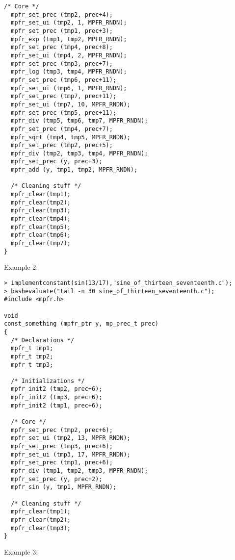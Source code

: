 \begin{center}
\begin{minipage}{15cm}
\begin{Verbatim}[frame=single]
  /* Core */
  mpfr_set_prec (tmp2, prec+4);
  mpfr_set_ui (tmp2, 1, MPFR_RNDN);
  mpfr_set_prec (tmp1, prec+3);
  mpfr_exp (tmp1, tmp2, MPFR_RNDN);
  mpfr_set_prec (tmp4, prec+8);
  mpfr_set_ui (tmp4, 2, MPFR_RNDN);
  mpfr_set_prec (tmp3, prec+7);
  mpfr_log (tmp3, tmp4, MPFR_RNDN);
  mpfr_set_prec (tmp6, prec+11);
  mpfr_set_ui (tmp6, 1, MPFR_RNDN);
  mpfr_set_prec (tmp7, prec+11);
  mpfr_set_ui (tmp7, 10, MPFR_RNDN);
  mpfr_set_prec (tmp5, prec+11);
  mpfr_div (tmp5, tmp6, tmp7, MPFR_RNDN);
  mpfr_set_prec (tmp4, prec+7);
  mpfr_sqrt (tmp4, tmp5, MPFR_RNDN);
  mpfr_set_prec (tmp2, prec+5);
  mpfr_div (tmp2, tmp3, tmp4, MPFR_RNDN);
  mpfr_set_prec (y, prec+3);
  mpfr_add (y, tmp1, tmp2, MPFR_RNDN);

  /* Cleaning stuff */
  mpfr_clear(tmp1);
  mpfr_clear(tmp2);
  mpfr_clear(tmp3);
  mpfr_clear(tmp4);
  mpfr_clear(tmp5);
  mpfr_clear(tmp6);
  mpfr_clear(tmp7);
}
\end{Verbatim}
\end{minipage}\end{center}
\noindent Example 2: 
\begin{center}\begin{minipage}{15cm}\begin{Verbatim}[frame=single]
> implementconstant(sin(13/17),"sine_of_thirteen_seventeenth.c");
> bashevaluate("tail -n 30 sine_of_thirteen_seventeenth.c");
#include <mpfr.h>

void
const_something (mpfr_ptr y, mp_prec_t prec)
{
  /* Declarations */
  mpfr_t tmp1;
  mpfr_t tmp2;
  mpfr_t tmp3;

  /* Initializations */
  mpfr_init2 (tmp2, prec+6);
  mpfr_init2 (tmp3, prec+6);
  mpfr_init2 (tmp1, prec+6);

  /* Core */
  mpfr_set_prec (tmp2, prec+6);
  mpfr_set_ui (tmp2, 13, MPFR_RNDN);
  mpfr_set_prec (tmp3, prec+6);
  mpfr_set_ui (tmp3, 17, MPFR_RNDN);
  mpfr_set_prec (tmp1, prec+6);
  mpfr_div (tmp1, tmp2, tmp3, MPFR_RNDN);
  mpfr_set_prec (y, prec+2);
  mpfr_sin (y, tmp1, MPFR_RNDN);

  /* Cleaning stuff */
  mpfr_clear(tmp1);
  mpfr_clear(tmp2);
  mpfr_clear(tmp3);
}
\end{Verbatim}
\end{minipage}\end{center}
\noindent Example 3: 
